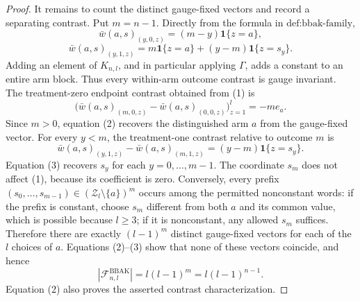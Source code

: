 \documentclass{article}
\begin{document}
\begin{proof}
It remains to count the distinct gauge-fixed vectors and record a separating contrast. Put \(m=n-1\). Directly from the formula in \(\text{def:bbak-family}\),
\[\bar w(a,s)_{(y,0,z)}=(m-y)\mathbf 1\{z=a\},\]
\[\bar w(a,s)_{(y,1,z)}=m\mathbf 1\{z=a\}+(y-m)\mathbf 1\{z=s_y\}.\tag{1}\]
Adding an element of \(K_{n,l}\), and in particular applying \(\Gamma\), adds a constant to an entire arm block. Thus every within-arm outcome contrast is gauge invariant. The treatment-zero endpoint contrast obtained from (1) is
\[\bigl(\bar w(a,s)_{(m,0,z)}-\bar w(a,s)_{(0,0,z)}\bigr)_{z=1}^l=-m e_a.\tag{2}\]
Since \(m>0\), equation (2) recovers the distinguished arm \(a\) from the gauge-fixed vector. For every \(y<m\), the treatment-one contrast relative to outcome \(m\) is
\[\bar w(a,s)_{(y,1,z)}-\bar w(a,s)_{(m,1,z)}=(y-m)\mathbf 1\{z=s_y\}.\tag{3}\]
Equation (3) recovers \(s_y\) for each \(y=0,\ldots,m-1\). The coordinate \(s_m\) does not affect (1), because its coefficient is zero. Conversely, every prefix \((s_0,\ldots,s_{m-1})\in(\mathcal Z_l\setminus\{a\})^m\) occurs among the permitted nonconstant words: if the prefix is constant, choose \(s_m\) different from both \(a\) and its common value, which is possible because \(l\ge3\); if it is nonconstant, any allowed \(s_m\) suffices. Therefore there are exactly \((l-1)^m\) distinct gauge-fixed vectors for each of the \(l\) choices of \(a\). Equations (2)--(3) show that none of these vectors coincide, and hence
\[|\mathcal F^{\mathrm{BBAK}}_{n,l}|=l(l-1)^m=l(l-1)^{n-1}.\]
Equation (2) also proves the asserted contrast characterization.
\end{proof}
\end{document}
